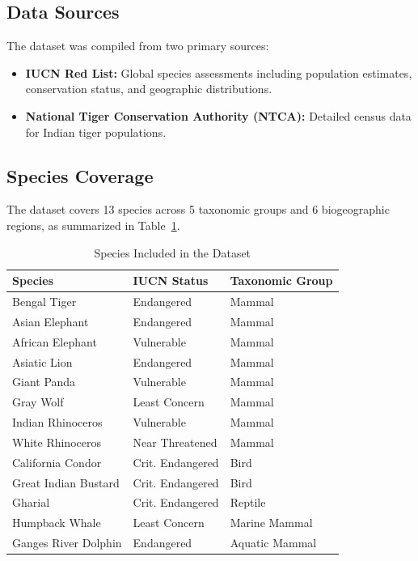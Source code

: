 \documentclass[conference]{IEEEtran}
\begin{document}
\subsection{Data Sources}
The dataset was compiled from two primary sources:
\begin{itemize}
\item \textbf{IUCN Red List:} Global species assessments including population estimates, conservation status, and geographic distributions.
\item \textbf{National Tiger Conservation Authority (NTCA):} Detailed census data for Indian tiger populations.
\end{itemize}

\subsection{Species Coverage}
The dataset covers 13 species across 5 taxonomic groups and 6 biogeographic regions, as summarized in Table~\ref{tab:species}.

\begin{table}[h]
\caption{Species Included in the Dataset}
\label{tab:species}
\centering
\footnotesize
\begin{tabular}{lll}
\toprule
\textbf{Species} & \textbf{IUCN Status} & \textbf{Taxonomic Group} \\
\midrule
Bengal Tiger & Endangered & Mammal \\
Asian Elephant & Endangered & Mammal \\
African Elephant & Vulnerable & Mammal \\
Asiatic Lion & Endangered & Mammal \\
Giant Panda & Vulnerable & Mammal \\
Gray Wolf & Least Concern & Mammal \\
Indian Rhinoceros & Vulnerable & Mammal \\
White Rhinoceros & Near Threatened & Mammal \\
California Condor & Crit. Endangered & Bird \\
Great Indian Bustard & Crit. Endangered & Bird \\
Gharial & Crit. Endangered & Reptile \\
Humpback Whale & Least Concern & Marine Mammal \\
Ganges River Dolphin & Endangered & Aquatic Mammal \\
\bottomrule
\end{tabular}
\end{table}
\end{document}
